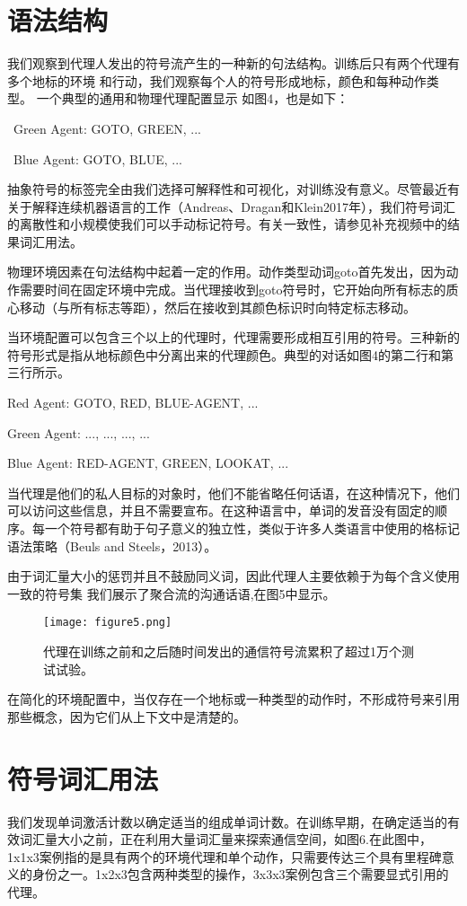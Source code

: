 \section{语法结构}
我们观察到代理人发出的符号流产生的一种新的句法结构。训练后只有两个代理有多个地标的环境
和行动，我们观察每个人的符号形成地标，颜色和每种动作类型。 一个典型的通用和物理代理配置显示
如图4，也是如下：
\par 
\   Green Agent: GOTO, GREEN, ...
\par 
\	Blue Agent: GOTO, BLUE, ...
\par 
抽象符号的标签完全由我们选择可解释性和可视化，对训练没有意义。尽管最近有关于解释连续机器语言的工作（Andreas、Dragan和Klein2017年），我们符号词汇的离散性和小规模使我们可以手动标记符号。有关一致性，请参见补充视频中的结果词汇用法。
\par 
物理环境因素在句法结构中起着一定的作用。动作类型动词goto首先发出，因为动作需要时间在固定环境中完成。当代理接收到goto符号时，它开始向所有标志的质心移动（与所有标志等距），然后在接收到其颜色标识时向特定标志移动。
\par 
当环境配置可以包含三个以上的代理时，代理需要形成相互引用的符号。三种新的符号形式是指从地标颜色中分离出来的代理颜色。典型的对话如图4的第二行和第三行所示。
\par 
\qquad Red Agent: GOTO, RED, BLUE-AGENT, ...
\par
\qquad Green Agent: ..., ..., ..., ...
\par
\qquad Blue Agent: RED-AGENT, GREEN, LOOKAT, ...
\par
当代理是他们的私人目标的对象时，他们不能省略任何话语，在这种情况下，他们可以访问这些信息，并且不需要宣布。在这种语言中，单词的发音没有固定的顺序。每一个符号都有助于句子意义的独立性，类似于许多人类语言中使用的格标记语法策略（Beuls and Steels，2013）。
\par 
由于词汇量大小的惩罚并且不鼓励同义词，因此代理人主要依赖于为每个含义使用一致的符号集 我们展示了聚合流的沟通话语,在图5中显示。
\begin{figure}[htb]
	\centering
	\texttt{[image: figure5.png]}
	\caption{代理在训练之前和之后随时间发出的通信符号流累积了超过1万个测试试验。}\label{fig:通信符号流累积}
\end{figure}
\par 
在简化的环境配置中，当仅存在一个地标或一种类型的动作时，不形成符号来引用那些概念，因为它们从上下文中是清楚的。


\section{符号词汇用法}
我们发现单词激活计数以确定适当的组成单词计数。在训练早期，在确定适当的有效词汇量大小之前，正在利用大量词汇量来探索通信空间，如图6.在此图中，1x1x3案例指的是具有两个的环境代理和单个动作，只需要传达三个具有里程碑意义的身份之一。1x2x3包含两种类型的操作，3x3x3案例包含三个需要显式引用的代理。


